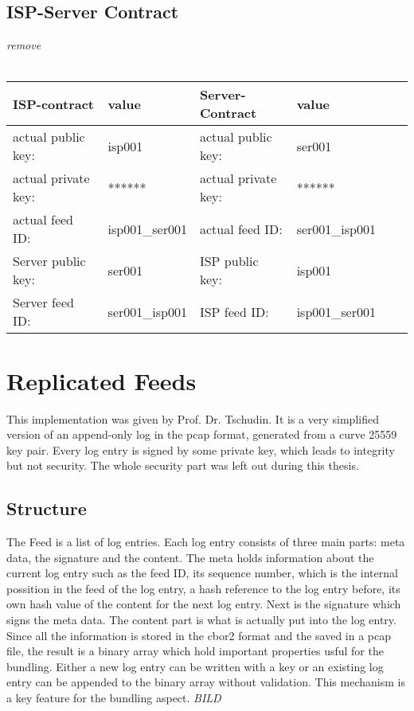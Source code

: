 \subsection{ISP-Server Contract}
\textit{remove}\\\\
\begin{tabular}{llllll} \toprule
    ISP-contract&value&Server-Contract&value\\ \midrule
    actual public key:& isp001 &  actual public key: &ser001   \\ 
    actual private key:& ****** & actual private key:& ******  \\
    actual feed ID:& isp001\_ser001 &actual feed ID:&ser001\_isp001\\ 
    Server public key:&ser001&ISP public key:&isp001\\
    Server feed ID:&ser001\_isp001&ISP feed ID:&isp001\_ser001\\\bottomrule
\end{tabular}
\section{Replicated Feeds}
This implementation was given by Prof. Dr. Tschudin. It is a very simplified version of an append-only log in the pcap format, generated from a curve 25559 key pair. Every log entry is signed by some private key, which leads to integrity but not security. The whole security part was left out during this thesis.
\subsection{Structure}
The Feed is a list of log entries. Each log entry consists of three main parts: meta data, the signature and the content. The meta holds information about the current log entry such as the feed ID, its sequence number, which is the internal possition in the feed of the log entry, a hash reference to the log entry before, its own hash value of the content for the next log entry. Next is the signature which signs the meta data. The content part is what is actually put into the log entry.\\
Since all the information is stored in the cbor2 format and the saved in a pcap file, the result is a binary array which hold important properties usful for the bundling. Either a new log entry can be written with a key or an existing log entry can be appended to the binary array without validation. This mechanism is a key feature for the bundling aspect.
\textit{BILD}
